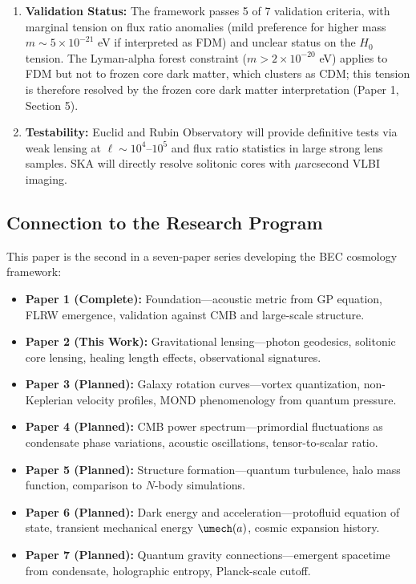 \documentclass[11pt,a4paper]{article}
\theoremstyle{definition}
\theoremstyle{remark}
\begin{document}
\begin{enumerate}[leftmargin=*, itemsep=0.3em]
\item \textbf{Validation Status:} The framework passes 5 of 7 validation criteria, with marginal tension on flux ratio anomalies (mild preference for higher mass $m \sim 5 \times 10^{-21}$ eV if interpreted as FDM) and unclear status on the $H_0$ tension. The Lyman-alpha forest constraint ($m > 2 \times 10^{-20}$ eV) applies to FDM but not to frozen core dark matter, which clusters as CDM; this tension is therefore resolved by the frozen core dark matter interpretation (Paper 1, Section 5).

\item \textbf{Testability:} Euclid and Rubin Observatory will provide definitive tests via weak lensing at $\ell \sim 10^4$--$10^5$ and flux ratio statistics in large strong lens samples. SKA will directly resolve solitonic cores with $\mu$arcsecond VLBI imaging.

\end{enumerate}

\subsection{Connection to the Research Program}
\label{sec:research_program}

This paper is the second in a seven-paper series developing the BEC cosmology framework:

\begin{itemize}[leftmargin=*, itemsep=0.3em]

\item \textbf{Paper 1 (Complete):} Foundation---acoustic metric from GP equation, FLRW emergence, validation against CMB and large-scale structure.

\item \textbf{Paper 2 (This Work):} Gravitational lensing---photon geodesics, solitonic core lensing, healing length effects, observational signatures.

\item \textbf{Paper 3 (Planned):} Galaxy rotation curves---vortex quantization, non-Keplerian velocity profiles, MOND phenomenology from quantum pressure.

\item \textbf{Paper 4 (Planned):} CMB power spectrum---primordial fluctuations as condensate phase variations, acoustic oscillations, tensor-to-scalar ratio.

\item \textbf{Paper 5 (Planned):} Structure formation---quantum turbulence, halo mass function, comparison to $N$-body simulations.

\item \textbf{Paper 6 (Planned):} Dark energy and acceleration---protofluid equation of state, transient mechanical energy $\umech(a)$, cosmic expansion history.

\item \textbf{Paper 7 (Planned):} Quantum gravity connections---emergent spacetime from condensate, holographic entropy, Planck-scale cutoff.

\end{itemize}
\end{document}
